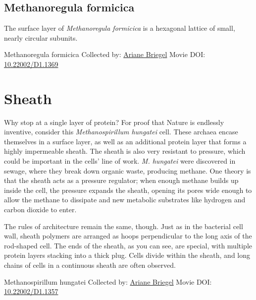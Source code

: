 \documentclass[]{tufte-book}
\begin{document}
\hypertarget{Methanoregula_formicica}{%
\subsection{Methanoregula formicica}\label{Methanoregula_formicica}}

The surface layer of \emph{Methanoregula formicica} is a hexagonal lattice of small, nearly circular subunits.



\hypertarget{htmlwidget-e45b44ca40322fb61ff1}{}

\label{fig:2-7d}Methanoregula formicica Collected by: \protect\hyperlink{ariane_briegel}{Ariane Briegel} Movie DOI: \href{https://doi.org/10.22002/D1.1369}{10.22002/D1.1369}

\hypertarget{sheath}{%
\section{Sheath}\label{sheath}}

Why stop at a single layer of protein? For proof that Nature is endlessly inventive, consider this \emph{Methanospirillum hungatei} cell. These archaea encase themselves in a surface layer, as well as an additional protein layer that forms a highly impermeable sheath. The sheath is also very resistant to pressure, which could be important in the cells' line of work. \emph{M. hungatei} were discovered in sewage, where they break down organic waste, producing methane. One theory is that the sheath acts as a pressure regulator; when enough methane builds up inside the cell, the pressure expands the sheath, opening its pores wide enough to allow the methane to dissipate and new metabolic substrates like hydrogen and carbon dioxide to enter.

The rules of architecture remain the same, though. Just as in the bacterial cell wall, sheath polymers are arranged as hoops perpendicular to the long axis of the rod-shaped cell. The ends of the sheath, as you can see, are special, with multiple protein layers stacking into a thick plug. Cells divide within the sheath, and long chains of cells in a continuous sheath are often observed.



\hypertarget{htmlwidget-9aacb831b8407ccd9247}{}

\label{fig:2-8}Methanospirillum hungatei Collected by: \protect\hyperlink{ariane_briegel}{Ariane Briegel} Movie DOI: \href{https://doi.org/10.22002/D1.1357}{10.22002/D1.1357}
\end{document}
